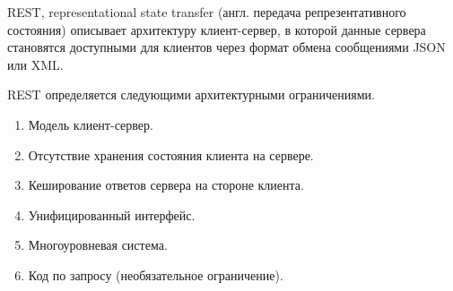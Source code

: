 
%
%

REST, representational state transfer (англ. передача репрезентативного состояния) описывает архитектуру клиент-сервер, в которой данные сервера становятся доступными для клиентов через формат обмена сообщениями JSON или XML. %

REST определяется следующими архитектурными ограничениями.

\begin{enumerate}[label*=\arabic*.]
	\item Модель клиент-сервер.
	\item Отсутствие хранения состояния клиента на сервере.
	\item Кеширование ответов сервера на стороне клиента.
	\item Унифицированный интерфейс.
	\item Многоуровневая система. %
	\item Код по запросу (необязательное ограничение).
\end{enumerate}




